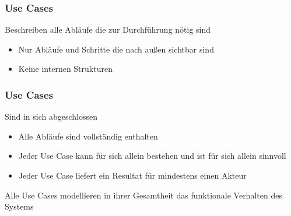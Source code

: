 \begin{frame}
\frametitle{Use Cases}
	Beschreiben alle Abläufe die zur Durchführung nötig sind
	\begin{itemize}
		\item Nur Abläufe und Schritte die nach außen sichtbar sind
		\item Keine internen Strukturen
	\end{itemize}
\end{frame}

\begin{frame}
\frametitle{Use Cases}
	Sind in sich abgeschlossen
	\begin{itemize}
		\item Alle Abläufe sind vollständig enthalten
		\item Jeder Use Case kann für sich allein bestehen und ist für sich allein sinnvoll
		\item Jeder Use Case liefert ein Resultat für mindestens einen Akteur
	\end{itemize}
	\bigskip
	Alle Use Cases modellieren in ihrer Gesamtheit das funktionale Verhalten des Systems
\end{frame}
